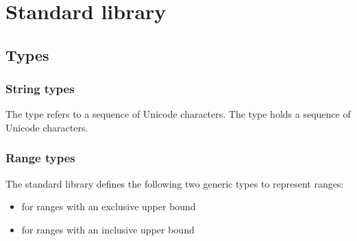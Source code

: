 
\chapter{Standard library}

\section{Types}

\subsection{String types}

The type  refers to a sequence of Unicode characters.
The type  holds a sequence of Unicode characters.

\subsection{Range types}

The standard library defines the following two generic types to represent
ranges:

\begin{itemize}
\item {} for ranges with an exclusive upper bound
\item {} for ranges with an inclusive upper bound
\end{itemize}
